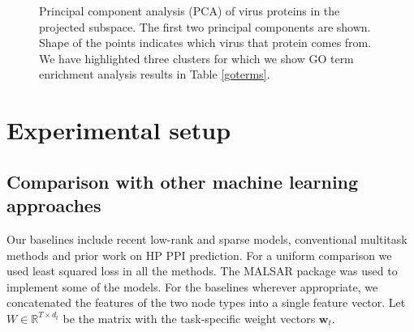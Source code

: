 \documentclass{bioinfo}
\begin{document}
\begin{figure}
\begin{floatrow}
{
\caption{Principal component analysis (PCA) of virus proteins in the projected subspace. The first two principal components are shown. Shape of the points indicates which virus that protein comes from. We have highlighted three clusters for which we show GO term enrichment analysis results in Table \ref{goterms}.}%
\label{fig:pca2}
}
\end{floatrow}
\end{figure}





\section{Experimental setup}

\subsection{Comparison with other machine learning approaches}
\label{mlmethods}
Our baselines include recent low-rank and sparse models, conventional multitask methods and prior work on HP PPI prediction. For a uniform comparison we used least squared loss in all the methods. The MALSAR \cite{malsar} package was used to implement some of the models. For the baselines wherever appropriate, we concatenated the features of the two node types into a single feature vector. Let $W \in \mathbb{R}^{T \times d_t}$ be the matrix with the task-specific weight vectors $\mathbf{w}_t$.
 
\end{document}
